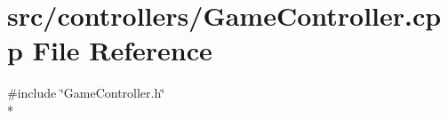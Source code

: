 \section{src/controllers/\-Game\-Controller.cpp File Reference}
\label{_game_controller_8cpp}
{\ttfamily \#include \char`\"{}Game\-Controller.\-h\char`\"{}}\\*

